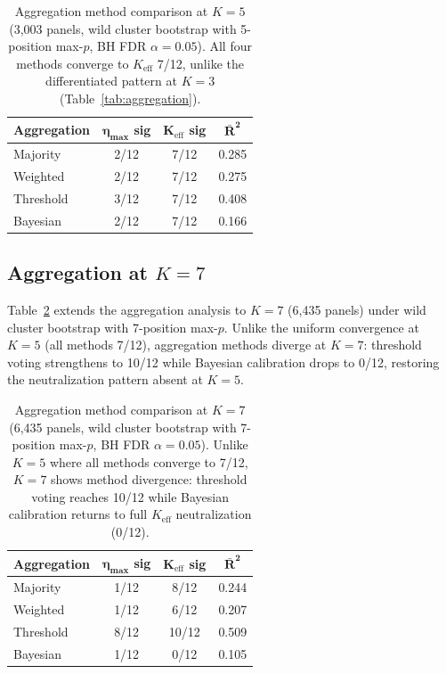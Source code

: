 \begin{table}[h]
\centering
\small
\begin{tabular}{lccc}
\toprule
\textbf{Aggregation} & $\boldsymbol{\eta_{\max}}$ \textbf{sig} & $\boldsymbol{K_{\mathrm{eff}}}$ \textbf{sig} & $\boldsymbol{\bar{R}^2}$ \\
\midrule
Majority   & 2/12  & 7/12 & 0.285 \\
Weighted   & 2/12  & 7/12 & 0.275 \\
Threshold  & 3/12  & 7/12 & 0.408 \\
Bayesian   & 2/12  & 7/12 & 0.166 \\
\bottomrule
\end{tabular}
\caption{Aggregation method comparison at $K{=}5$ (3{,}003 panels, wild cluster bootstrap with 5-position max-$p$, BH FDR $\alpha{=}0.05$). All four methods converge to $K_{\mathrm{eff}}$ 7/12, unlike the differentiated pattern at $K{=}3$ (Table~\ref{tab:aggregation}).}
\label{tab:aggregation_k5}
\end{table}

\subsection{Aggregation at \texorpdfstring{$K{=}7$}{K=7}}
\label{app:aggregation_k7}

Table~\ref{tab:aggregation_k7} extends the aggregation analysis to $K{=}7$ (6{,}435 panels) under wild cluster bootstrap with 7-position max-$p$. Unlike the uniform convergence at $K{=}5$ (all methods 7/12), aggregation methods diverge at $K{=}7$: threshold voting strengthens to 10/12 while Bayesian calibration drops to 0/12, restoring the neutralization pattern absent at $K{=}5$.

\begin{table}[h]
\centering
\small
\begin{tabular}{lccc}
\toprule
\textbf{Aggregation} & $\boldsymbol{\eta_{\max}}$ \textbf{sig} & $\boldsymbol{K_{\mathrm{eff}}}$ \textbf{sig} & $\boldsymbol{\bar{R}^2}$ \\
\midrule
Majority   & 1/12  & 8/12 & 0.244 \\
Weighted   & 1/12  & 6/12 & 0.207 \\
Threshold  & 8/12  & 10/12 & 0.509 \\
Bayesian   & 1/12  & 0/12 & 0.105 \\
\bottomrule
\end{tabular}
\caption{Aggregation method comparison at $K{=}7$ (6{,}435 panels, wild cluster bootstrap with 7-position max-$p$, BH FDR $\alpha{=}0.05$). Unlike $K{=}5$ where all methods converge to 7/12, $K{=}7$ shows method divergence: threshold voting reaches 10/12 while Bayesian calibration returns to full $K_{\mathrm{eff}}$ neutralization (0/12).}
\label{tab:aggregation_k7}
\end{table}


